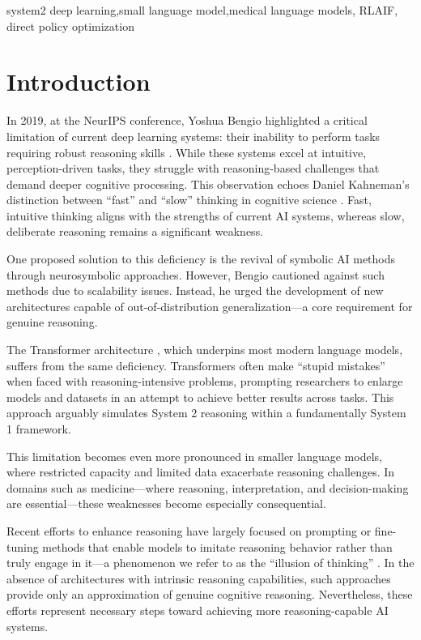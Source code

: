 \documentclass[conference]{IEEEtran}
\begin{document}
	\begin{IEEEkeywords}
		system2 deep learning,small language model,medical language models, RLAIF, direct policy optimization
	\end{IEEEkeywords}
	
	\section{Introduction}
In 2019, at the NeurIPS conference, Yoshua Bengio highlighted a critical limitation of current deep learning systems: their inability to perform tasks requiring robust reasoning skills
\cite{b1}.
While these systems excel at intuitive, perception-driven tasks, they struggle with reasoning-based challenges that demand deeper cognitive processing. This observation echoes Daniel Kahneman’s distinction between “fast” and “slow” thinking in cognitive science
\cite{b2}.
Fast, intuitive thinking aligns with the strengths of current AI systems, whereas slow, deliberate reasoning remains a significant weakness.

One proposed solution to this deficiency is the revival of symbolic AI methods through neurosymbolic approaches. However, Bengio cautioned against such methods due to scalability issues. Instead, he urged the development of new architectures capable of out-of-distribution generalization—a core requirement for genuine reasoning.

The Transformer architecture
\cite{b3}, which underpins most modern language models, suffers from the same deficiency. Transformers often make “stupid mistakes” when faced with reasoning-intensive problems, prompting researchers to enlarge models and datasets in an attempt to achieve better results across tasks. This approach arguably simulates System 2 reasoning within a fundamentally System 1 framework.

This limitation becomes even more pronounced in smaller language models, where restricted capacity and limited data exacerbate reasoning challenges. In domains such as medicine—where reasoning, interpretation, and decision-making are essential—these weaknesses become especially consequential.

Recent efforts to enhance reasoning have largely focused on prompting or fine-tuning methods that enable models to imitate reasoning behavior rather than truly engage in it—a phenomenon we refer to as the “illusion of thinking”
\cite{b4}.
In the absence of architectures with intrinsic reasoning capabilities, such approaches provide only an approximation of genuine cognitive reasoning. Nevertheless, these efforts represent necessary steps toward achieving more reasoning-capable AI systems.
\end{document}
